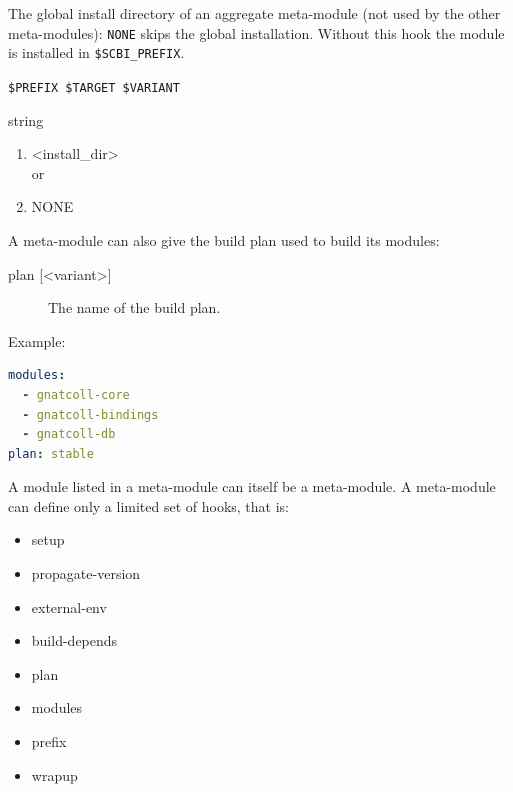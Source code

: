 \documentclass[a4paper,12pt,twoside]{article}
\newcommand{\code}[1]{\texttt{#1}}
\begin{document}
\begin{description}[style=nextline]
	\item[prefix {[}<variant>{]}] \label{prefix}The global install directory of an aggregate meta-module (not used by the other meta-modules): \code{NONE} skips the global installation. Without this hook the module is installed in \code{\$SCBI\_PREFIX}.
	\begin{description}[font=\textit,style=standard]
		\item[parameter] \tabto{2cm} \code{\$PREFIX \$TARGET \$VARIANT}
		\item[return] \tabto{2cm} string
		\begin{enumerate}
			\item <install\_dir>
			\\ or
			\item NONE
		\end{enumerate}
    \end{description}
\end{description}

A meta-module can also give the build plan used to build its modules:

\begin{description}
	\item[plan {[}<variant>{]}] The name of the build plan.
	\begin{description}[font=\textit,style=standard]
		\item[parameter] \tabto{2cm} NONE
		\item[return] \tabto{2cm} string
		\begin{enumerate}
			\item <plan-name>
		\end{enumerate}
	\end{description}
\end{description}

Example:

\begin{lstlisting}[language={yaml}]
modules:
  - gnatcoll-core
  - gnatcoll-bindings
  - gnatcoll-db
plan: stable
\end{lstlisting}

A module listed in a meta-module can itself be a meta-module. A meta-module can define only a limited set of hooks, that is:

\begin{itemize}[font=\texttt]
	\item setup
	\item propagate-version
	\item external-env
	\item build-depends
	\item plan
	\item modules
	\item prefix
	\item wrapup
\end{itemize}
\end{document}
